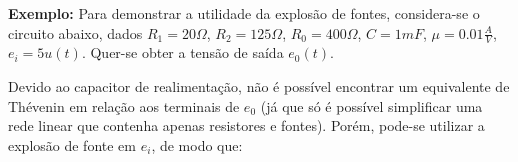 \documentclass{article}
\numberwithin{equation}{section}
\newlength\Colsep
\begin{document}
\vspace{2mm}

\textbf{Exemplo:} Para demonstrar a utilidade da explosão de fontes, considera-se o circuito abaixo, dados $R_1=20 \Omega$, $R_2=125 \Omega$, $R_0=400 \Omega$, $C=1 mF$, $\mu = 0.01 \frac{A}{V}$, $e_i=5 u(t)$. Quer-se obter a tensão de saída $e_0(t)$.

\noindent\begin{minipage}{0.95\textwidth}
\begin{minipage}[c][7cm][c]{\dimexpr0.6\textwidth-0.5\Colsep\relax}
    \begin{center}
    \end{center}
\end{minipage} \hfill
\begin{minipage}[c][7cm][c]{\dimexpr0.4\textwidth-0.5\Colsep\relax}
    Devido ao capacitor de realimentação, não é possível encontrar um equivalente de Thévenin em relação aos terminais de $e_0$ (já que só é possível simplificar uma rede linear que contenha apenas resistores e fontes). Porém, pode-se utilizar a explosão de fonte em $e_i$, de modo que:
\end{minipage}
\end{minipage}
\end{document}
